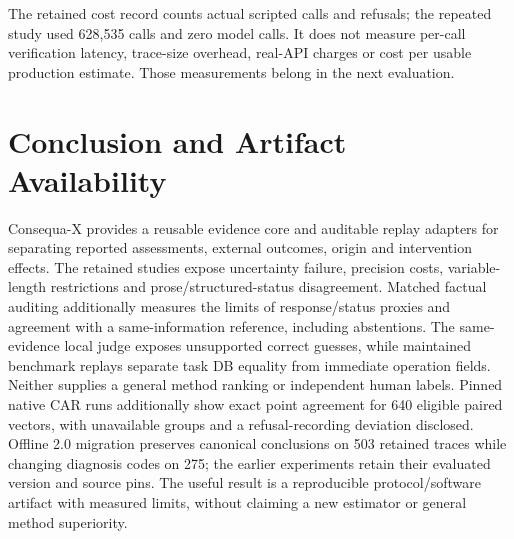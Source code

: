 \documentclass[conference]{IEEEtran}
\begin{document}
The retained cost record counts actual scripted calls and refusals; the repeated
study used 628,535 calls and zero model calls. It does not measure per-call
verification latency, trace-size overhead, real-API charges or cost per usable
production estimate. Those measurements belong in the next evaluation.

\section{Conclusion and Artifact Availability}
Consequa-X provides a reusable evidence core and auditable replay adapters for
separating reported assessments, external outcomes, origin and intervention
effects. The retained studies expose uncertainty failure, precision costs,
variable-length restrictions and prose/structured-status disagreement. Matched
factual auditing additionally measures the limits of response/status proxies
and agreement with a same-information reference, including abstentions.
The same-evidence local judge exposes unsupported correct guesses, while
maintained benchmark replays separate task DB equality from immediate operation
fields. Neither supplies a general method ranking or independent human labels.
Pinned native CAR runs additionally show exact point agreement for 640
eligible paired vectors, with unavailable groups and a refusal-recording
deviation disclosed. Offline 2.0 migration preserves canonical conclusions
on 503 retained traces while changing diagnosis codes on 275; the earlier
experiments retain their evaluated version and source pins.
The useful result is a reproducible protocol/software artifact with measured
limits, without claiming a new estimator or general method superiority.
\end{document}
